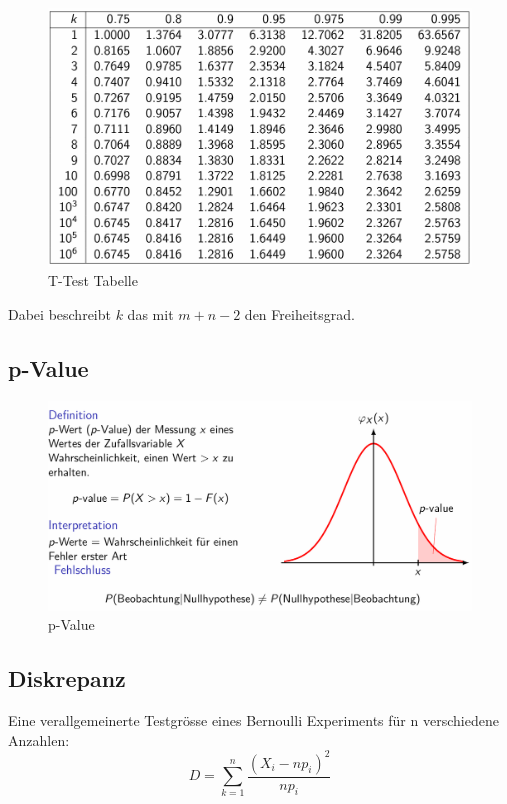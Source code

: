 \documentclass[../Main.tex]{subfiles}
\begin{document}
\begin{figure}[H]
    \centering
    \includegraphics[width=1\linewidth]{Images/t-test-tabelle.png}
    \caption{T-Test Tabelle}
\end{figure}
Dabei beschreibt \(k\) das mit \(m+n-2\) den Freiheitsgrad.

\subsection{p-Value}

\begin{figure}[H]
    \centering
    \includegraphics[width=1\linewidth]{Images/p-value.png}
    \caption{p-Value}
\end{figure}

\subsection{Diskrepanz}
Eine verallgemeinerte Testgrösse eines Bernoulli Experiments für
n verschiedene Anzahlen:
\begin{equation}
    D = \sum_{k=1}^{n} \frac{(X_i - np_i)^2}{np_i}
\end{equation}
\end{document}
